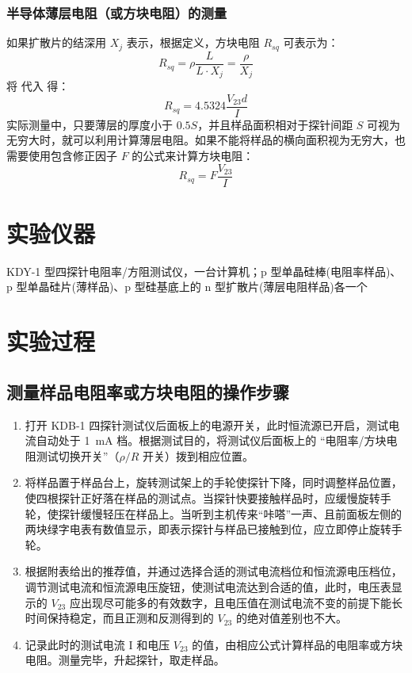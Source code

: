 \documentclass[a4paper,utf8]{article}
\begin{document}
        \subsubsection{半导体薄层电阻（或方块电阻）的测量}
            如果扩散片的结深用 $X_j$ 表示，根据定义，方块电阻 $R_{sq}$ 可表示为：
            \begin{equation}
                R_{sq}=\rho\frac{L}{L\cdot X_{j}}=\frac{\rho}{X_{j}} \label{eq:2}
            \end{equation}
            将  代入  得：
            \begin{equation}
                R_{sq}=4.5324\frac{V_{23} d}{I} \label{eq:3}
            \end{equation}
            实际测量中，只要薄层的厚度小于 $0.5S$，并且样品面积相对于探针间距 $S$ 可视为无穷大时，就可以利用计算薄层电阻。如果不能将样品的横向面积视为无穷大，也需要使用包含修正因子 $F$ 的公式来计算方块电阻：
            \begin{equation}
                R_{sq}= F \frac{V_{23}}{I} \label{eq:4}
            \end{equation}
        
\section{实验仪器}%
    KDY-1 型四探针电阻率/方阻测试仪，一台计算机；p 型单晶硅棒(电阻率样品)、p 型单晶硅片(薄样品)、p 型硅基底上的 n 型扩散片(薄层电阻样品)各一个
\section{实验过程}%
    \subsection{测量样品电阻率或方块电阻的操作步骤}
    \begin{enumerate}
        \item 打开 KDB-1 四探针测试仪后面板上的电源开关，此时恒流源已开启，测试电流自动处于 \SI{1}{\milli\ampere} 档。根据测试目的，将测试仪后面板上的 “电阻率/方块电阻测试切换开关”（$\rho/R$ 开关）拨到相应位置。
        \item 将样品置于样品台上，旋转测试架上的手轮使探针下降，同时调整样品位置，使四根探针正好落在样品的测试点。当探针快要接触样品时，应缓慢旋转手轮，使探针缓慢轻压在样品上。当听到主机传来“咔嗒”一声、且前面板左侧的两块绿字电表有数值显示，即表示探针与样品已接触到位，应立即停止旋转手轮。
        \item 根据附表给出的推荐值，并通过选择合适的测试电流档位和恒流源电压档位，调节测试电流和恒流源电压旋钮，使测试电流达到合适的值，此时，电压表显示的 $V_{23}$ 应出现尽可能多的有效数字，且电压值在测试电流不变的前提下能长时间保持稳定，而且正测和反测得到的 $V_{23}$ 的绝对值差别也不大。
        \item 记录此时的测试电流 I 和电压 $V_{23}$ 的值，由相应公式计算样品的电阻率或方块电阻。测量完毕，升起探针，取走样品。
    \end{enumerate}
\end{document}
